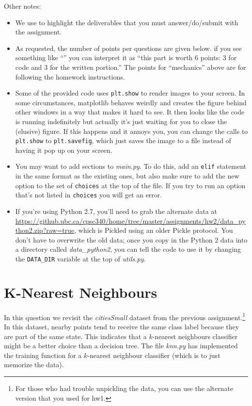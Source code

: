 \documentclass{article}
\begin{document}
Other notes:
\begin{itemize}
\item We use  to highlight the deliverables that you must answer/do/submit with the assignment.
\item As requested, the number of points per questions are given below. if you see something like ``'' you can interpret it as ``this part is worth 6 points: 3 for code and 3 for the written portion.'' The points for ``mechanics'' above are for following the homework instructions. 
\item Some of the provided code uses \texttt{plt.show} to render images to your screen. In some circumstances, matplotlib behaves weirdly and creates the figure behind other windows in a way that makes it hard to see. It then looks like the code is running indefinitely but actually it's just waiting for you to close the (elusive) figure. If this happens and it annoys you, you can change the calls to \texttt{plt.show} to \texttt{plt.savefig}, which just saves the image to a file instead of having it pop up on your screen.
\item You may want to add sections to \emph{main.py}. To do this, add an \texttt{elif} statement in the same format as the existing ones, but also make sure to add the new option to the set of \texttt{choices} at the top of the file. If you try to run an option that's not listed in \texttt{choices} you will get an error.
\item If you're using Python 2.7, you'll need to grab the alternate data at \url{https://github.ubc.ca/cpsc340/home/tree/master/assignments/hw2/data_python2.zip?raw=true}, which is Pickled using an older Pickle protocol. You don't have to overwrite the old data; once you copy in the Python 2 data into a directory called \emph{data\_python2}, you can tell the code to use it by changing the \texttt{DATA\string_DIR} variable at the top of \emph{utils.py}.
\end{itemize}

\section{K-Nearest Neighbours}

In this question we revisit the \emph{citiesSmall} dataset from the previous assignment.\footnote{For those who had trouble unpickling the data, you can use the alternate version that you used for hw1.}  In this dataset, nearby points tend to receive the same class label because they are part of the same state. This indicates that a $k$-nearest neighbours classifier might be a better choice than a decision tree. The file \emph{knn.py} has implemented the training function for a $k$-nearest neighbour classifier (which is to just memorize the data).
\end{document}
